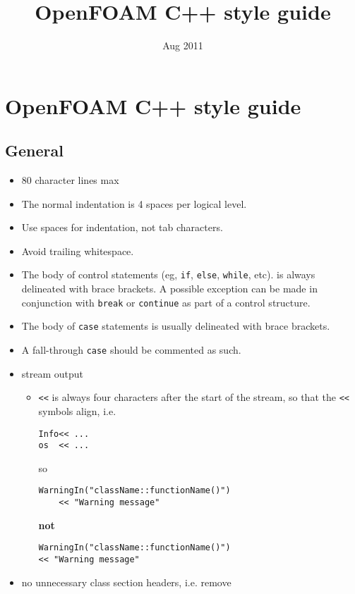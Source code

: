 \documentclass[11pt]{article}
\title{OpenFOAM C++ style guide}
\date{Aug 2011}
\begin{document}
\maketitle

\setcounter{tocdepth}{3}
\tableofcontents
\vspace*{1cm}

\section{OpenFOAM C++ style guide}
\label{sec-1}
\subsection{General}
\label{sec-1-1}

\begin{itemize}
\item 80 character lines max
\item The normal indentation is 4 spaces per logical level.
\item Use spaces for indentation, not tab characters.
\item Avoid trailing whitespace.
\item The body of control statements (eg, \texttt{if}, \texttt{else}, \texttt{while}, etc). is
      always delineated with brace brackets. A possible exception can be
      made in conjunction with \texttt{break} or \texttt{continue} as part of a control
      structure.
\item The body of \texttt{case} statements is usually delineated with brace brackets.
\item A fall-through \texttt{case} should be commented as such.
\item stream output
\begin{itemize}
\item \texttt{<<} is always four characters after the start of the stream,
        so that the \texttt{<<} symbols align, i.e.

\begin{verbatim}
Info<< ...
os  << ...
\end{verbatim}
        so

\begin{verbatim}
WarningIn("className::functionName()")
    << "Warning message"
\end{verbatim}
        \textbf{not}

\begin{verbatim}
WarningIn("className::functionName()")
<< "Warning message"
\end{verbatim}
\end{itemize}
\item no unnecessary class section headers, i.e. remove
\end{itemize}
\end{document}
